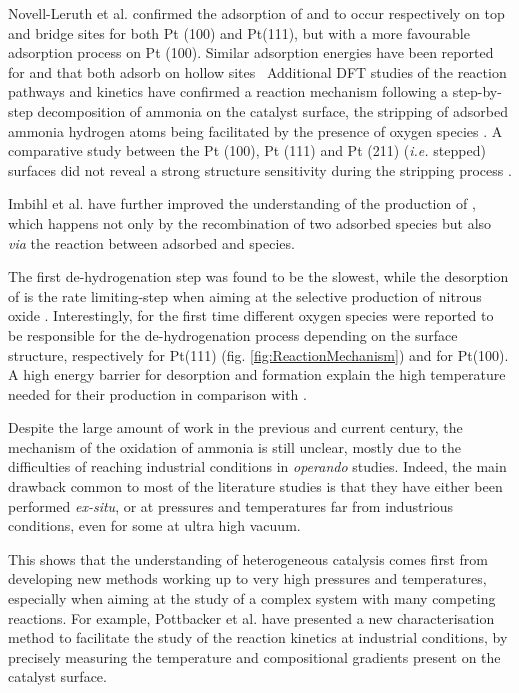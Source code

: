 Novell-Leruth et al. \parencite*{NovellLeruth2005} confirmed the adsorption of  and  to occur respectively on top and bridge sites for both Pt (100) and Pt(111), but with a more favourable adsorption process on Pt (100).
Similar adsorption energies have been reported for  and  that both adsorb on hollow sites \
Additional DFT studies of the reaction pathways and kinetics have confirmed a reaction mechanism following a step-by-step decomposition of ammonia on the catalyst surface, the stripping of adsorbed ammonia hydrogen atoms being facilitated by the presence of oxygen species \parencite{Offermans2006}.
A comparative study between the Pt (100), Pt (111) and Pt (211) (\textit{i.e.} stepped) surfaces did not reveal a strong structure sensitivity during the \ce{NH_3} stripping process \parencite{Offermans2007}.

Imbihl et al. \parencite*{Imbihl2007} have further improved the understanding of the production of , which happens not only by the recombination of two adsorbed  species but also \textit{via} the reaction between adsorbed  and  species.

The first de-hydrogenation step was found to be the slowest, while the desorption of  is the rate limiting-step when aiming at the selective production of nitrous oxide \parencite{NovellLeruth2008}.
Interestingly, for the first time different oxygen species were reported to be responsible for the de-hydrogenation process depending on the surface structure, respectively \ce{O} for Pt(111) (fig. \ref{fig:ReactionMechanism}) and  for Pt(100).
A high energy barrier for \ce{NO} desorption and \ce{N_2O} formation explain the high temperature needed for their production in comparison with \ce{N_2}.

Despite the large amount of work in the previous and current century, the mechanism of the oxidation of ammonia is still unclear, mostly due to the difficulties of reaching industrial conditions in \textit{operando} studies.
Indeed, the main drawback common to most of the literature studies is that they have either been performed \textit{ex-situ}, or at pressures and temperatures far from industrious conditions, even for some at ultra high vacuum.

This shows that the understanding of heterogeneous catalysis comes first from developing new methods working up to very high pressures and temperatures, especially when aiming at the study of a complex system with many competing reactions.
For example, Pottbacker et al. \parencite*{Pottbacker2022} have presented a new characterisation method to facilitate the study of the reaction kinetics at industrial conditions, by precisely measuring the temperature and compositional gradients present on the catalyst surface.

